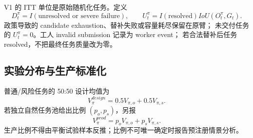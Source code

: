 V1 的 ITT 单位是原始随机化任务。定义
\[
D_t^\pi=I(\text{unresolved or severe failure}),\qquad
U_t^\pi=I(\text{resolved})IoU(O_t^\pi,G_t).
\]
政策导致的 candidate exhaustion、替补失败或容量耗尽保留在原臂；
未交付任务的 $U_t^\pi=0$。工人 invalid submission 记录为 worker event；
若合法替补后任务 resolved，不把最终任务质量改为零。

\subsection{实验分布与生产标准化}

普通/风险任务的 50:50 设计均值为
\[
V_\pi^{design}=0.5V_{\pi,o}+0.5V_{\pi,s}.
\]
若独立自然任务池给出比例 $(p_o,p_s)$，另报
\[
V_\pi^{prod}=p_oV_{\pi,o}+p_sV_{\pi,s}.
\]
生产比例不得由平衡试验样本反推；比例不可唯一确定时报告预注册情景分析。

